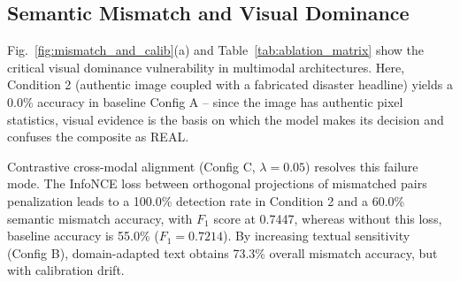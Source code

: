 \documentclass[conference]{IEEEtran}
\begin{document}
\subsection{Semantic Mismatch and Visual Dominance}
\begin{table}[t]
\caption{Six-Configuration Multi-Criteria Decision Matrix}
\label{tab:ablation_matrix}
\centering
\renewcommand{\arraystretch}{0.96}
\end{table}

Fig.~\ref{fig:mismatch_and_calib}(a) and Table~\ref{tab:ablation_matrix} show the critical visual dominance vulnerability in multimodal architectures. Here, Condition 2 (authentic image coupled with a fabricated disaster headline) yields a 0.0\% accuracy in baseline Config A – since the image has authentic pixel statistics, visual evidence is the basis on which the model makes its decision and confuses the composite as REAL.

Contrastive cross-modal alignment (Config C, $\lambda = 0.05$) resolves this failure mode. The InfoNCE loss between orthogonal projections of mismatched pairs penalization leads to a 100.0\% detection rate in Condition 2 and a 60.0\% semantic mismatch accuracy, with $F_1$ score at 0.7447, whereas without this loss, baseline accuracy is 55.0\% ($F_1 = 0.7214$). By increasing textual sensitivity (Config B), domain-adapted text obtains 73.3\% overall mismatch accuracy, but with calibration drift.
\end{document}
